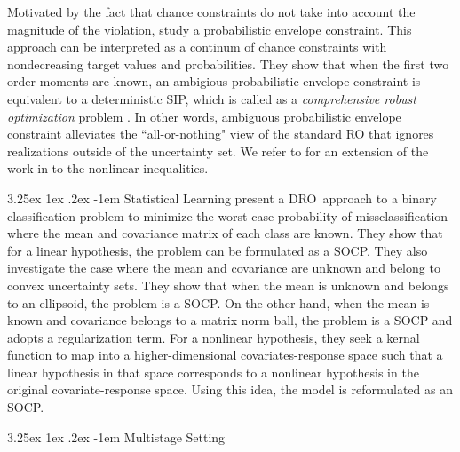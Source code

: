 \documentclass[final,onefignum,onetabnum]{class}
\makeatletter
\renewcommand\paragraph{\@startsection{paragraph}{4}{\z@}%
  {3.25ex \@plus1ex \@minus.2ex}%
  {-1em}%
  {\normalfont\normalsize\bfseries}}
\newcommand{\dro}{DRO}
\makeatother
\begin{document}
Motivated by the fact that chance constraints do not take into account the magnitude of the violation, \citet{xu2012optimization} study a probabilistic envelope constraint. This approach can be interpreted as a continum of chance constraints with nondecreasing target values and probabilities. They show that when the first two order moments are known, an ambigious probabilistic envelope constraint is equivalent to a deterministic SIP, which is called as a {\it comprehensive robust optimization} problem  \citep{ben2006comprehensive,ben2010soft}. In other words, ambiguous probabilistic envelope constraint  alleviates the  ``all-or-nothing" view of the standard RO that ignores realizations outside of the uncertainty set.  We refer to \citet{yang2016chance} for an extension of the work in \citet{xu2012optimization} to the nonlinear inequalities. 



\paragraph{Statistical Learning}
\citet{lanckriet2002} present a \dro\ approach to a binary classification problem to minimize the worst-case probability of missclassification where the  mean and covariance matrix
of each class are known. They show that for a linear hypothesis, the problem can be formulated as a SOCP. They also investigate the case where  the mean and covariance are unknown and belong to convex uncertainty sets. They show that when the mean is unknown and belongs to an ellipsoid, the problem is a SOCP. On the other hand, when the mean is known and covariance belongs to a matrix norm ball, the problem is a SOCP and adopts a regularization term. For a nonlinear hypothesis, they seek a kernal function to map into a higher-dimensional covariates-response space such that a linear hypothesis in that space corresponds to a nonlinear hypothesis in the original covariate-response space. Using this idea, the model is reformulated as an SOCP. %








\paragraph{Multistage Setting}
\end{document}
